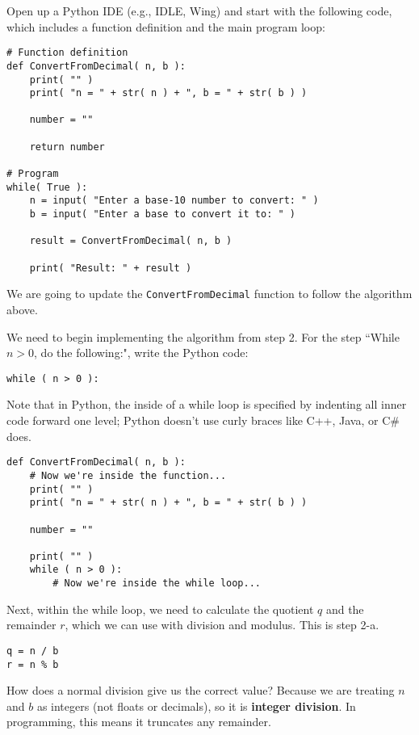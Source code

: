 \documentclass[a4paper,12pt]{book}
\begin{document}
        Open up a Python IDE (e.g., IDLE, Wing) and start with the following code,
        which includes a function definition and the main program loop:

\begin{lstlisting}[style=pycode]
# Function definition
def ConvertFromDecimal( n, b ):
    print( "" )
    print( "n = " + str( n ) + ", b = " + str( b ) )

    number = ""

    return number

# Program
while( True ):
    n = input( "Enter a base-10 number to convert: " )
    b = input( "Enter a base to convert it to: " )

    result = ConvertFromDecimal( n, b )

    print( "Result: " + result )
\end{lstlisting}

        We are going to update the \texttt{ConvertFromDecimal}
        function to follow the algorithm above.

    \newpage

    We need to begin implementing the algorithm from step 2.
    For the step ``While $n > 0$, do the following:", write the Python
    code:

\begin{verbatim}
while ( n > 0 ):
\end{verbatim}

    Note that in Python, the inside of a while loop is specified by
    indenting all inner code forward one level; Python doesn't use
    curly braces like C++, Java, or C\# does.
    
\begin{lstlisting}[style=pycode]
def ConvertFromDecimal( n, b ):
    # Now we're inside the function...
    print( "" )
    print( "n = " + str( n ) + ", b = " + str( b ) )

    number = ""

    print( "" )
    while ( n > 0 ):
        # Now we're inside the while loop...
\end{lstlisting}

    Next, within the while loop, we need to calculate the quotient $q$
    and the remainder $r$, which we can use with division and modulus.
    This is step 2-a.

\begin{verbatim}
q = n / b
r = n % b
\end{verbatim}

    How does a normal division give us the correct value? Because
    we are treating $n$ and $b$ as integers (not floats or decimals),
    so it is \textbf{integer division}. In programming, this means
    it truncates any remainder.
\end{document}
